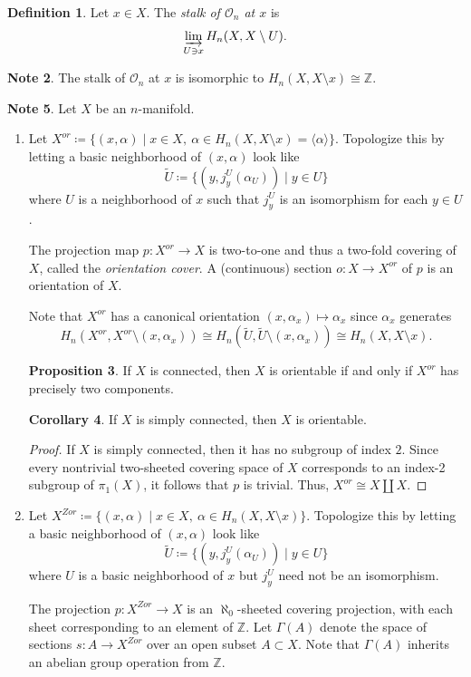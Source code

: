\documentclass[10pt,letterpaper,cm]{nupset}
\theoremstyle{definition}
\newtheorem{definition}{Definition}[subsection]
\newtheorem{note}[definition]{Note}
\theoremstyle{theorem}
\newtheorem{prop}[definition]{Proposition}
\newtheorem{corollary}[definition]{Corollary}
\theoremstyle{remark}
\newcommand{\Z}{\mathbb Z}
\newcommand{\1}{\mathbb{1}}
\newcommand{\0}{\vec 0}
\begin{document}
\begin{definition}
Let $x\in X$. The \textit{stalk of $\mathcal{O}_n$ at $x$} is  $$\varinjlim_{U\ni x} H_n(X, X \setminus U).$$
\end{definition}

\begin{note}
The stalk of $\mathcal{O}_n$ at $x$ is isomorphic to $H_n(X, X \setminus x) \cong \Z$.
\end{note}

\begin{note}
Let $X$ be an $n$-manifold.
\begin{enumerate}
\item Let $X^{or} \coloneqq  \{(x, \alpha) \mid x\in X, \ \alpha \in H_n(X, X \setminus x) =\langle \alpha \rangle \}$. Topologize this by letting a basic neighborhood of $(x, \alpha)$ look like $$\widetilde{U}\coloneqq  \{(y, j_y^U(\alpha_U)) \mid y \in U\}$$ where $U$ is a neighborhood of $x$ such that $j_y^U$ is an isomorphism for each $y\in U$.

The projection map $p: X^{or} \to X$ is two-to-one and thus a two-fold covering of $X$, called the \textit{orientation cover}. A (continuous) section $o: X \to X^{or}$ of $p$ is an orientation of $X$.

Note that $X^{or}$ has a canonical orientation $(x, \alpha_x) \mapsto \alpha_x$ since $\alpha_x$ generates $$H_n(X^{or}, X^{or} \setminus (x, \alpha_x)) \cong H_n(\widetilde{U}, \widetilde{U} \setminus (x, \alpha_x)) \cong H_n(X, X \setminus x).$$
\begin{prop}
If $X$ is connected, then $X$ is orientable if and only if $X^{or}$ has precisely two components. 
\end{prop}
\begin{corollary}
If $X$ is simply connected, then $X$ is orientable. 
\end{corollary}
\begin{proof}
If $X$ is simply connected, then it has no subgroup of index $2$. Since every nontrivial two-sheeted covering space of $X$ corresponds to an index-2 subgroup of $\pi_1(X)$, it follows that $p$ is trivial. Thus, $X^{or} \cong X \coprod X$. 
\end{proof}
\item Let $X^{Zor} \coloneqq  \{(x, \alpha) \mid x\in X, \ \alpha \in H_n(X, X \setminus x) \}$. Topologize this by letting a basic neighborhood of $(x, \alpha)$ look like $$\widetilde{U}\coloneqq  \{(y, j_y^U(\alpha_U)) \mid y \in U\}$$ where $U$ is a basic neighborhood of $x$ but $j_y^U$ need not be an isomorphism. 

The projection $p: X^{Zor} \to X$ is an $\aleph_0$-sheeted covering projection, with each sheet corresponding to an element of $\Z$. Let  $\Gamma(A)$ denote the space of sections $s: A \to X^{Zor}$ over an open subset $A\subset X$. Note that $\Gamma(A)$ inherits an abelian group operation from $\Z$. 
\end{enumerate}
\end{note}
\end{document}
